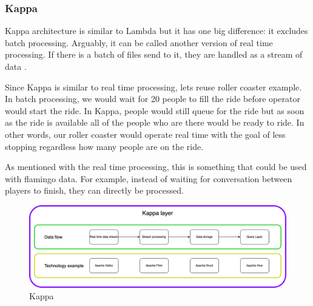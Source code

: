 \subsubsection{Kappa}\label{Kappa}

Kappa architecture is similar to Lambda but it has one big difference: it excludes batch processing. Arguably, it can be called another version of real time processing. If there is a batch of files send to it, they are handled as a stream of data \parencite{feick2018fundamentals}.

Since Kappa is similar to real time processing, lets reuse roller coaster example. In batch processing, we would wait for 20 people to fill the ride before operator would start the ride. In Kappa, people would still queue for the ride but as soon as the ride is available all of the people who are there would be ready to ride. In other words, our roller coaster would operate real time with the goal of less stopping regardless how many people are on the ride.

As mentioned with the real time processing, this is something that could be used with flamingo data. For example, instead of waiting for conversation between players to finish, they can directly be processed.

\begin{figure}[H]
\includegraphics[scale=0.35]{img/ProcessingParadigms/BigData-Kappa.png}
\centering
\caption{Kappa}
\label{fig:Kappa}
\end{figure}